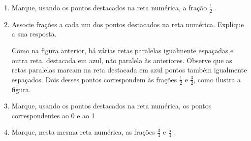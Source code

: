 \begin{enumerate} [\quad a)] %
  \item     Marque, usando os pontos destacados na reta numérica, a fração     $\frac{1}{2}$    . 
  \item     Associe frações a cada um dos pontos destacados na reta numérica. Explique a sua resposta.    \mbox{} \newline      
\begin{center}
\end{center}

Como na figura anterior, há várias retas paralelas igualmente espaçadas e outra reta, destacada em azul, não paralela às anteriores. Observe que as retas paralelas marcam na reta destacada em azul pontos também igualmente espaçados. Dois desses pontos correspondem às frações $\frac{1}{2}$ e $\frac{3}{2}$, como ilustra a figura. 

  \item     Marque, usando os pontos destacados na reta numérica, os pontos correspondentes ao 0 e ao 1
  \item     Marque, nesta mesma reta numérica, as frações     $\frac{3}{4}$     e     $\frac{5}{4}$    .
\begin{center}
\end{center}

\end{enumerate} %

